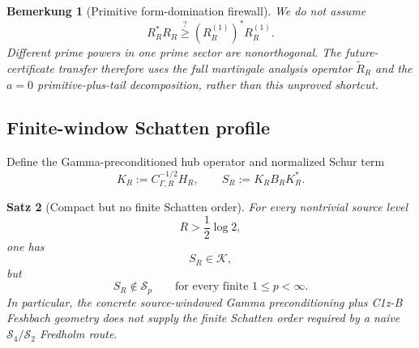 \documentclass[11pt,a4paper]{amsart}
\newtheorem{theorem}{Satz}[section]
\newtheorem{remark}[theorem]{Bemerkung}
\newcommand{\cK}{\mathcal K}
\newcommand{\Sp}{\mathcal S}
\begin{document}
\begin{remark}[Primitive form-domination firewall]\label{rem:primitive}
We do not assume
\[
 R_R^*R_R\stackrel?\ge(R_R^{(1)})^*R_R^{(1)}.
\]
Different prime powers in one prime sector are nonorthogonal.  The future-certificate
transfer therefore uses the full martingale analysis operator
$\widetilde R_R$ and the $a=0$ primitive-plus-tail decomposition, rather than this
unproved shortcut.
\end{remark}

\subsection{Finite-window Schatten profile}

Define the Gamma-preconditioned hub operator and normalized Schur term
\[
 K_R:=C_{\Gamma,R}^{-1/2}H_R,
 \qquad
 S_R:=K_RB_RK_R^*.
\tag{3.6}\label{eq:gamma-preconditioned-schur}
\]

\begin{theorem}[Compact but no finite Schatten order]\label{thm:schatten}
For every nontrivial source level
\[
 R>\frac12\log2,
\]
one has
\[
 \boxed{S_R\in\cK,}
\]
but
\[
 \boxed{S_R\notin\Sp_p\qquad\text{for every finite }1\le p<\infty.}
\tag{3.7}\label{eq:schatten-nogo}
\]
In particular, the concrete source-windowed Gamma preconditioning plus C1z-B
Feshbach geometry does not supply the finite Schatten order required by a naive
$\Sp_4/\Sp_2$ Fredholm route.
\end{theorem}
\end{document}
